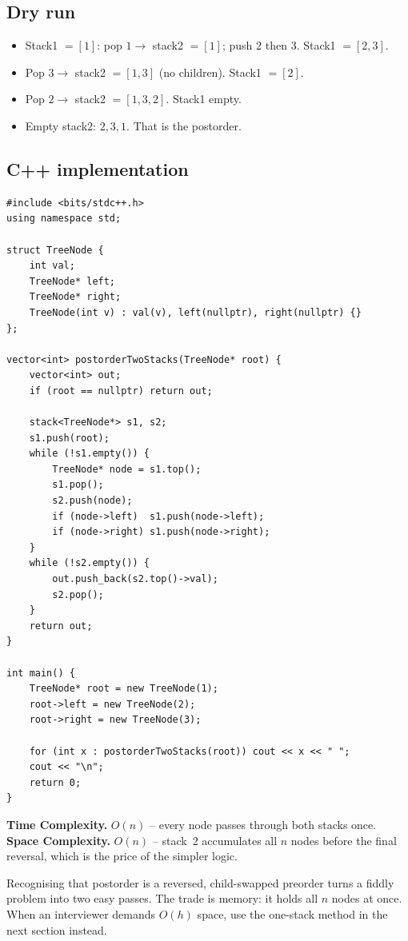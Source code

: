 \subsection*{Dry run}


\begin{itemize}
  \item Stack1 $=[1]$: pop $1\to$ stack2 $=[1]$; push $2$ then $3$. Stack1
        $=[2,3]$.
  \item Pop $3\to$ stack2 $=[1,3]$ (no children). Stack1 $=[2]$.
  \item Pop $2\to$ stack2 $=[1,3,2]$. Stack1 empty.
  \item Empty stack2: $2,3,1$. That is the postorder.
\end{itemize}

\subsection*{C++ implementation}

\begin{lstlisting}
#include <bits/stdc++.h>
using namespace std;

struct TreeNode {
    int val;
    TreeNode* left;
    TreeNode* right;
    TreeNode(int v) : val(v), left(nullptr), right(nullptr) {}
};

vector<int> postorderTwoStacks(TreeNode* root) {
    vector<int> out;
    if (root == nullptr) return out;

    stack<TreeNode*> s1, s2;
    s1.push(root);
    while (!s1.empty()) {
        TreeNode* node = s1.top();
        s1.pop();
        s2.push(node);
        if (node->left)  s1.push(node->left);
        if (node->right) s1.push(node->right);
    }
    while (!s2.empty()) {
        out.push_back(s2.top()->val);
        s2.pop();
    }
    return out;
}

int main() {
    TreeNode* root = new TreeNode(1);
    root->left = new TreeNode(2);
    root->right = new TreeNode(3);

    for (int x : postorderTwoStacks(root)) cout << x << " ";
    cout << "\n";
    return 0;
}
\end{lstlisting}

\begin{complexitybox}
\textbf{Time Complexity.} $O(n)$ -- every node passes through both stacks
once. \textbf{Space Complexity.} $O(n)$ -- stack~2 accumulates all $n$
nodes before the final reversal, which is the price of the simpler logic.
\end{complexitybox}

\begin{takeawaybox}
Recognising that postorder is a reversed, child-swapped preorder turns a
fiddly problem into two easy passes. The trade is memory: it holds all $n$
nodes at once. When an interviewer demands $O(h)$ space, use the one-stack
method in the next section instead.
\end{takeawaybox}
